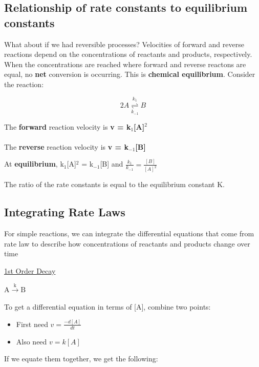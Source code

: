 \documentclass[12pt, letterpaper]{article}
\begin{document}
    \subsection*{Relationship of rate constants to equilibrium constants}

    What about if we had reversible processes? Velocities of forward and reverse reactions depend on the concentrations of 
    reactants and products, respectively. When the concentrations are reached where forward and reverse reactons are equal, 
    no \textbf{net} conversion is occurring. This is \textbf{chemical equilibrium}. Consider the reaction:

    \begin{equation}
        2 A \stackrel{k_1}{\underset{k_{-1}}{\rightleftharpoons}} B
    \end{equation}

    The \textbf{forward} reaction velocity is \textbf{v = k$_1$[A]$^2$} \\ \\
    The \textbf{reverse} reaction velocity is \textbf{v = k$_{-1}$[B]}


    At \textbf{equilibrium}, k$_1$[A]$^2$ = k$_{-1}$[B] and \( \frac{k_1}{k_{-1}} = \frac{[B]}{[A]^2} \)

    The ratio of the rate constants is equal to the equilibrium constant K. 

    \subsection*{Integrating Rate Laws}

    For simple reactions, we can integrate the differential equations that come from rate law to describe how concentrations of reactants and products change over time

    \underline{1st Order Decay}
    
    \(\mathrm{A} \stackrel{\mathrm{k}}{\longrightarrow} \mathrm{B} \)

    To get a differential equation in terms of [A], combine two points: 
    \begin{itemize}
        \item First need \(v = \frac{-d[A]}{dt} \)
        \item Also need \(v = k[A] \)
    \end{itemize}

    \newpage

    If we equate them together, we get the following: 
\end{document}
